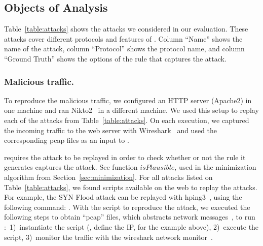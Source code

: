 \documentclass[sigconf,review, anonymous]{acmart}
\begin{document}
\subsection{Objects of Analysis}
\label{sec:dataset-benign}
\label{attack-reproduction}

Table~\ref{table:attacks} shows the attacks we considered in our
evaluation. These attacks cover different protocols and features of
\tname{}. Column ``Name'' shows the name of the attack, column
``Protocol'' shows the protocol name, and column ``Ground Truth''
shows the options of the rule that captures the attack.

\subsubsection{Malicious traffic.}To reproduce the malicious traffic, we
configured an HTTP server (Apache2) in one machine and ran
Nikto2~\cite{nikto} in a different machine. We used this setup to
replay each of the attacks from Table~\ref{table:attacks}.  On each
execution, we captured the incoming traffic to the web server with
Wireshark~\cite{wireshark-net-monitor} and used the corresponding pcap
files as an input to \tname.

  \tname{} requires the attack to
be replayed in order to check whether or not the rule it generates
captures the attack.  See function $\mathit{isPlausible}$, used in the
minimization algorithm from Section~\ref{sec:minimization}. For all
attacks listed on Table~\ref{table:attacks}, we found scripts
available on the web to replay the attacks. For example, the SYN Flood
attack can be replayed with hping3~\cite{hping3}, using the following
command: . With the script to reproduce the attack, we executed the
following steps to obtain ``pcap'' files, which abstracts network
messages~\cite{pcap}, to run \tname:~1)~instantiate the script (\eg{},
define the IP, for the example above), 2)~execute the script,
3)~monitor the traffic with the wireshark network
monitor~\cite{wireshark-net-monitor}.
\end{document}
